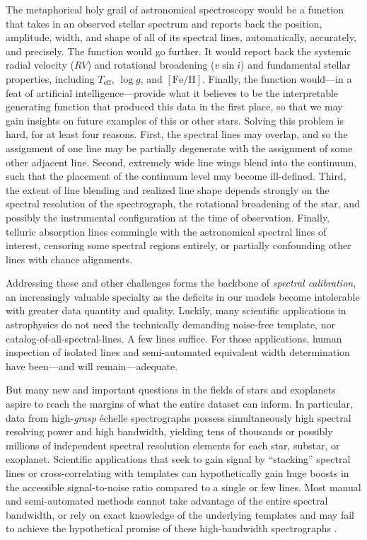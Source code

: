\documentclass[trackchanges]{aastex631}
\begin{document}
The metaphorical holy grail of astronomical spectroscopy would be a function that takes in an observed stellar spectrum and reports back the position, amplitude, width, and shape of all of its spectral lines, automatically, accurately, and precisely.  The function would go further. It would report back the systemic radial velocity ($RV$) and rotational broadening ($v\sin{i}$) and fundamental stellar properties, including $T_{\mathrm{eff}}$, $\log{g}$, and $[\mathrm{Fe}/\mathrm{H}]$.  Finally, the function would---in a feat of artificial intelligence---provide what it believes to be the interpretable generating function that produced this data in the first place, so that we may gain insights on future examples of this or other stars.  Solving this problem is hard, for at least four reasons.  First, the spectral lines may overlap, and so the assignment of one line may be partially degenerate with the assignment of some other adjacent line.  Second, extremely wide line wings blend into the continuum, such that the placement of the continuum level may become ill-defined.  Third, the extent of line blending and realized line shape depends strongly on the spectral resolution of the spectrograph, the rotational broadening of the star, and possibly the instrumental configuration at the time of observation.  Finally, telluric absorption lines commingle with the astronomical spectral lines of interest, censoring some spectral regions entirely, or partially confounding other lines with chance alignments.

Addressing these and other challenges forms the backbone of \emph{spectral calibration}, an increasingly valuable specialty as the deficits in our models become intolerable with greater data quantity and quality.  Luckily, many scientific applications in astrophysics do not need the technically demanding noise-free template, nor catalog-of-all-spectral-lines.  A few lines suffice.  For those applications, human inspection of isolated lines and semi-automated equivalent width determination have been---and will remain---adequate.

But many new and important questions in the fields of stars and exoplanets aspire to reach the margins of what the entire dataset can inform.  In particular, data from high-\emph{grasp} \'echelle spectrographs possess simultaneously high spectral resolving power and high bandwidth, yielding tens of thousands or possibly millions of independent spectral resolution elements for each star, substar, or exoplanet.  Scientific applications that seek to gain signal by ``stacking'' spectral lines or cross-correlating with templates can hypothetically gain huge boosts in the accessible signal-to-noise ratio compared to a single or few lines.  Most manual and semi-automated methods cannot take advantage of the entire spectral bandwidth, or rely on exact knowledge of the underlying templates and may fail to achieve the hypothetical promise of these high-bandwidth spectrographs \citep{2020AJ....160..198H}.
\end{document}
